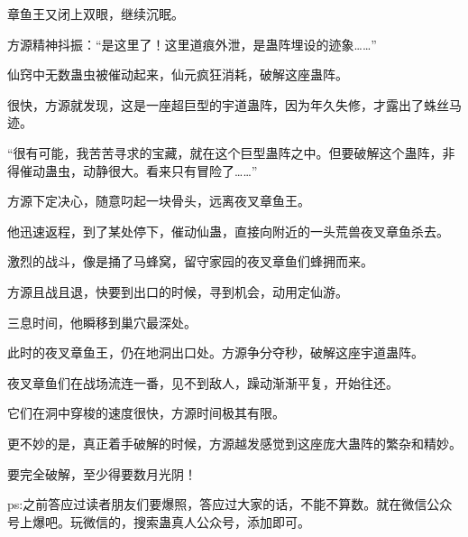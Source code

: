 \begin{this_body}
章鱼王又闭上双眼，继续沉眠。

方源精神抖振：“是这里了！这里道痕外泄，是蛊阵埋设的迹象……”

仙窍中无数蛊虫被催动起来，仙元疯狂消耗，破解这座蛊阵。

很快，方源就发现，这是一座超巨型的宇道蛊阵，因为年久失修，才露出了蛛丝马迹。

“很有可能，我苦苦寻求的宝藏，就在这个巨型蛊阵之中。但要破解这个蛊阵，非得催动蛊虫，动静很大。看来只有冒险了……”

方源下定决心，随意叼起一块骨头，远离夜叉章鱼王。

他迅速返程，到了某处停下，催动仙蛊，直接向附近的一头荒兽夜叉章鱼杀去。

激烈的战斗，像是捅了马蜂窝，留守家园的夜叉章鱼们蜂拥而来。

方源且战且退，快要到出口的时候，寻到机会，动用定仙游。

三息时间，他瞬移到巢穴最深处。

此时的夜叉章鱼王，仍在地洞出口处。方源争分夺秒，破解这座宇道蛊阵。

夜叉章鱼们在战场流连一番，见不到敌人，躁动渐渐平复，开始往还。

它们在洞中穿梭的速度很快，方源时间极其有限。

更不妙的是，真正着手破解的时候，方源越发感觉到这座庞大蛊阵的繁杂和精妙。

要完全破解，至少得要数月光阴！

ps:之前答应过读者朋友们要爆照，答应过大家的话，不能不算数。就在微信公众号上爆吧。玩微信的，搜索蛊真人公众号，添加即可。

\end{this_body}

